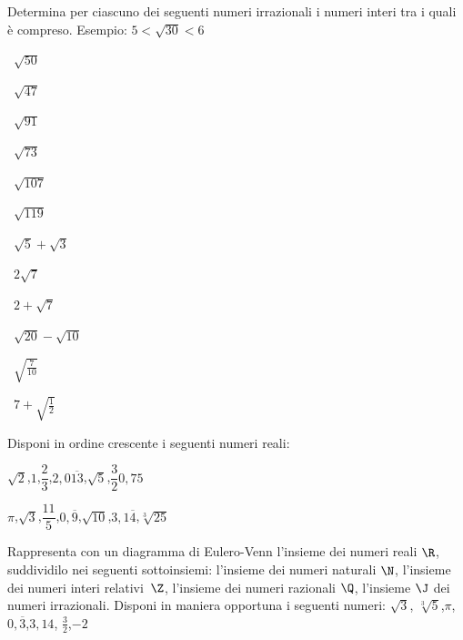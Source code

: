 \begin{esercizio}
\label{ese:1.4}
 Determina per ciascuno dei seguenti numeri irrazionali i numeri interi tra i quali è compreso. Esempio: \(5<\sqrt{30}<6\)
\begin{htmulticols}{4}
\begin{enumeratea}
 \item~\(\sqrt{50}\)
 \item~\(\sqrt{47}\)
 \item~\(\sqrt{91}\)
 \item~\(\sqrt{73}\)
 \item~\(\sqrt{107}\)
 \item~\(\sqrt{119}\)
 \item~\(\sqrt 5+\sqrt 3\)
 \item~\(2\sqrt 7\)
 \item~\(2+\sqrt 7\)
 \item~\(\sqrt{20}-\sqrt{10}\)
 \item~\(\sqrt{\frac 7{10}}\)
 \item~\(7+\sqrt{\frac 1 2}\)
\end{enumeratea}
\end{htmulticols}
\end{esercizio}

\begin{esercizio}
\label{ese:1.5}
 Disponi in ordine crescente i seguenti numeri reali:
 \begin{enumeratea}
 \item \(\sqrt 2\),\quad \(1\),\quad \(\dfrac 2 3\),\quad \(2,0\overline{13}\),\quad \(\sqrt 5\),\quad \(\dfrac 3 2\)\quad \(0,75\)
 \item \(\pi\),\quad \(\sqrt 3\),\quad \(\dfrac{11} 5\),\quad \(0,\overline 9\),\quad \(\sqrt{10}\),\quad \(3,1\overline 4\),\quad \(\sqrt[3]{25}\)
 \end{enumeratea}
\end{esercizio}

\begin{esercizio}
\label{ese:1.6}
 Rappresenta con un diagramma di Eulero-Venn l'insieme dei numeri reali 
\(\R\), suddividilo nei seguenti sottoinsiemi: l'insieme dei numeri 
naturali \(\N\), l'insieme dei numeri interi relativi~\(\Z\), l'insieme dei 
numeri razionali \(\Q\), l'insieme \(\J\) dei numeri irrazionali. 
Disponi in maniera opportuna i seguenti numeri: \(\sqrt 3\),\quad 
\(\sqrt[3]5\),\quad\(\pi\),\quad \(0,\overline 3\),\quad \(3,14\),\quad 
\(\frac 3 2\),\quad\(-2\)
\end{esercizio}

